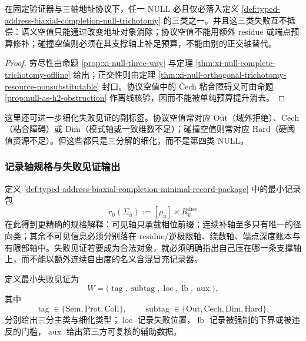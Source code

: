 \begin{proposition}[三分解的穷尽性与正交性]\label{prop:typed-address-biaxial-completion-null-exhaustive}
在固定验证器与三轴地址协议下，任一 \(\mathrm{NULL}\) 必且仅必落入定义 \ref{def:typed-address-biaxial-completion-null-trichotomy} 的三类之一。并且这三类失败互不抵偿：语义空值只能通过改变地址对象消除；协议空值不能用额外 residue 或端点预算修补；碰撞空值则必须在其支撑轴上补足预算，不能由别的正交轴替代。
\end{proposition}
\begin{proof}
穷尽性由命题 \ref{prop:xi-null-three-way} 与定理 \ref{thm:xi-null-complete-trichotomy-offline} 给出；正交性则由定理 \ref{thm:xi-null-orthogonal-trichotomy-resource-nonsubstitutable} 封口。协议空值中的 Čech 粘合障碍又可由命题 \ref{prop:null-as-h2-obstruction} 作离线核验，因而不能被单纯预算提升消去。
\end{proof}

这里还可进一步细化失败见证的副标签。协议空值常对应 \(\mathrm{Out}\)（域外拒绝）、\(\mathrm{Cech}\)（粘合障碍）或 \(\mathrm{Dim}\)（模式轴或一致维数不足）；碰撞空值则常对应 \(\mathrm{Hard}\)（硬阈值资源不足）。但这些都只是三分解的细化，而不是第四类 \(\mathrm{NULL}\)。

\subsubsection{记录轴规格与失败见证输出}\label{subsubsec:typed-address-biaxial-completion-witness-spec}
定义 \ref{def:typed-address-biaxial-completion-minimal-record-package} 中的最小记录包
\[
r_0(\Sigma_{\hat u})
:=
[\rho_{\hat u}]\times R^{\mathrm{disc}}_{\hat u}
\]
在此得到更精确的规格解释：可见轴只承载相位前缀；连续补轴至多只有唯一的径向类；其余不可见信息必须分别落在 residue/逆极限轴、绕数轴、端点深度账本与有限部轴中。失败见证若要成为合法对象，就必须明确指出自己压在哪一条支撑轴上，而不能以额外连续自由度的名义含混冒充记录器。

\begin{definition}[失败见证包]\label{def:typed-address-biaxial-completion-failure-witness}
定义最小失败见证为
\[
W=
\bigl(
\operatorname{tag},
\operatorname{subtag},
\operatorname{loc},
\operatorname{lb},
\operatorname{aux}
\bigr),
\]
其中
\[
\operatorname{tag}\in\{\mathrm{Sem},\mathrm{Prot},\mathrm{Coll}\},
\qquad
\operatorname{subtag}\in\{\mathrm{Out},\mathrm{Cech},\mathrm{Dim},\mathrm{Hard}\},
\]
分别给出三分主类与细化类型；\(\operatorname{loc}\) 记录失败位置，\(\operatorname{lb}\) 记录被强制的下界或被违反的门槛，\(\operatorname{aux}\) 给出第三方可复核的辅助数据。
\end{definition}

